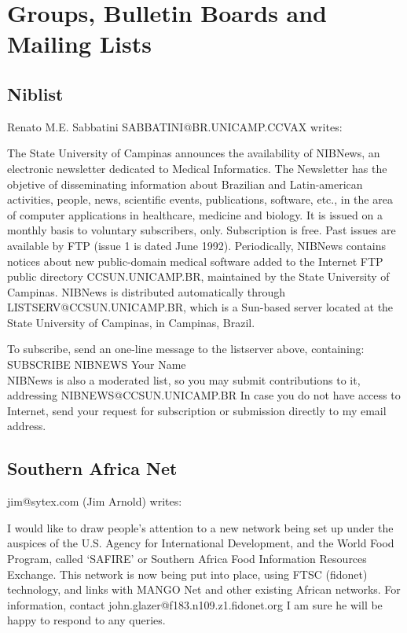 \section{Groups, Bulletin Boards and Mailing Lists}

\subsection{Niblist}
Renato M.E. Sabbatini SABBATINI@BR.UNICAMP.CCVAX writes:
 
The State University of Campinas announces the availability of NIBNews,
an electronic newsletter dedicated to Medical Informatics.
 The Newsletter has the objetive of disseminating information about
Brazilian and Latin-american activities, people, news, scientific
events, publications, software, etc., in the area of computer
applications in healthcare, medicine and biology. It is issued
on a monthly basis to voluntary subscribers, only. Subscription is
free. Past issues are available by FTP (issue 1 is dated June 1992).
Periodically, NIBNews contains notices about new public-domain medical
software added to the Internet FTP public directory CCSUN.UNICAMP.BR,
maintained by the State University of Campinas.
NIBNews is distributed automatically through LISTSERV@CCSUN.UNICAMP.BR,
which is a Sun-based server located at the State University of Campinas,
in Campinas, Brazil.
 
To subscribe, send an one-line message to the listserver above, containing:\\
 SUBSCRIBE NIBNEWS Your Name\\
 NIBNews is also a moderated list, so you may submit contributions to it,
addressing NIBNEWS@CCSUN.UNICAMP.BR
 In case you do not have access to Internet, send your request for
subscription or submission directly to my email address.

\subsection{Southern Africa Net}

jim@sytex.com (Jim Arnold) writes:

I would like to draw people's attention to a new network
being set up under the auspices of the U.S. Agency for International
Development, and the World Food Program, called `SAFIRE' or
Southern Africa Food Information Resources Exchange.
This network is now being put into place, using FTSC (fidonet)
technology, and links with MANGO Net and other existing African
networks.
For information, contact john.glazer@f183.n109.z1.fidonet.org
I am sure he will be happy to respond to any queries.

